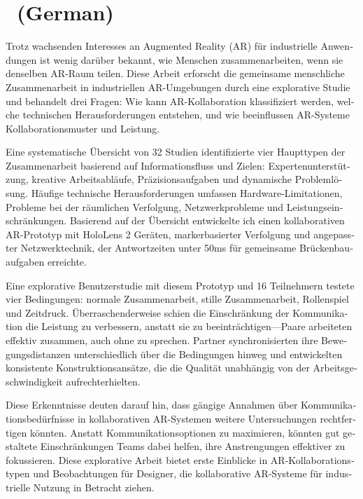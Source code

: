 \chapter{\abstractname ~(German)}

\begin{otherlanguage}{ngerman}
Trotz wachsenden Interesses an Augmented Reality (AR) für industrielle Anwendungen ist wenig darüber bekannt, wie Menschen zusammenarbeiten, wenn sie denselben AR-Raum teilen. Diese Arbeit erforscht die gemeinsame menschliche Zusammenarbeit in industriellen AR-Umgebungen durch eine explorative Studie und behandelt drei Fragen: Wie kann AR-Kollaboration klassifiziert werden, welche technischen Herausforderungen entstehen, und wie beeinflussen AR-Systeme Kollaborationsmuster und Leistung.

Eine systematische Übersicht von 32 Studien identifizierte vier Haupttypen der Zusammenarbeit basierend auf Informationsfluss und Zielen: Expertenunterstützung, kreative Arbeitsabläufe, Präzisionsaufgaben und dynamische Problemlösung. Häufige technische Herausforderungen umfassen Hardware-Limitationen, Probleme bei der räumlichen Verfolgung, Netzwerkprobleme und Leistungseinschränkungen. Basierend auf der Übersicht entwickelte ich einen kollaborativen AR-Prototyp mit HoloLens 2 Geräten, markerbasierter Verfolgung und angepasster Netzwerktechnik, der Antwortzeiten unter 50ms für gemeinsame Brückenbauaufgaben erreichte.

Eine explorative Benutzerstudie mit diesem Prototyp und 16 Teilnehmern testete vier Bedingungen: normale Zusammenarbeit, stille Zusammenarbeit, Rollenspiel und Zeitdruck. Überraschenderweise schien die Einschränkung der Kommunikation die Leistung zu verbessern, anstatt sie zu beeinträchtigen—Paare arbeiteten effektiv zusammen, auch ohne zu sprechen. Partner synchronisierten ihre Bewegungsdistanzen unterschiedlich über die Bedingungen hinweg und entwickelten konsistente Konstruktionsansätze, die die Qualität unabhängig von der Arbeitsgeschwindigkeit aufrechterhielten.

Diese Erkenntnisse deuten darauf hin, dass gängige Annahmen über Kommunikationsbedürfnisse in kollaborativen AR-Systemen weitere Untersuchungen rechtfertigen könnten. Anstatt Kommunikationsoptionen zu maximieren, könnten gut gestaltete Einschränkungen Teams dabei helfen, ihre Anstrengungen effektiver zu fokussieren. Diese explorative Arbeit bietet erste Einblicke in AR-Kollaborationstypen und Beobachtungen für Designer, die kollaborative AR-Systeme für industrielle Nutzung in Betracht ziehen.

\end{otherlanguage}


\makeatletter
{}
{\renewcommand{\abstractname}{Abstract}}
{\renewcommand{\abstractname}{Kurzfassung}}
\makeatother